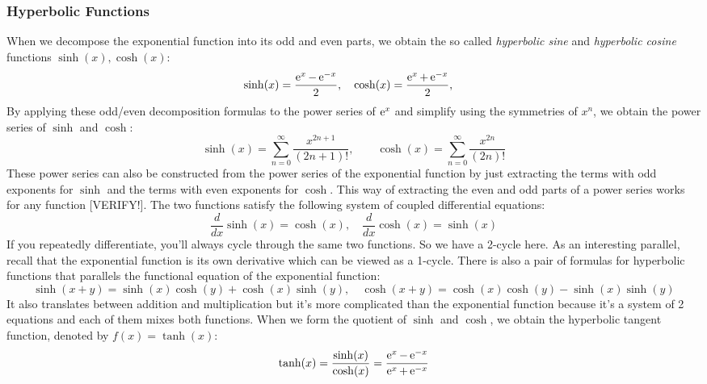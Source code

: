\subsubsection{Hyperbolic Functions}
When we decompose the exponential function into its odd and even parts, we obtain the so called \emph{hyperbolic sine} and \emph{hyperbolic cosine} functions $\sinh(x), \cosh(x)$:
\begin{equation}
\sinh(x) =	\frac{\operatorname{\mathrm{e}}^x - \operatorname{\mathrm{e}}^{-x}}{2}, \quad	
\cosh(x) =	\frac{\operatorname{\mathrm{e}}^x + \operatorname{\mathrm{e}}^{-x}}{2}, \quad
\end{equation}
By applying these odd/even decomposition formulas to the power series of $\operatorname{\mathrm{e}}^x$ and simplify using the symmetries of $x^n$, we obtain the power series of $\sinh$ and $\cosh$: 
\begin{equation}
\sinh(x) = \sum_{n=0}^{\infty} \frac{x^{2n+1}}{(2n+1)!}, \qquad
\cosh(x) = \sum_{n=0}^{\infty} \frac{x^{2n}  }{(2n)!}
\end{equation}
These power series can also be constructed from the power series of the exponential function by just extracting the terms with odd exponents for $\sinh$ and the terms with even exponents for $\cosh$. This way of extracting the even and odd parts of a power series works for any function [VERIFY!]. The two functions satisfy the following system of coupled differential equations:
\begin{equation}
\frac{d}{dx} \sinh(x) = \cosh(x), \quad
\frac{d}{dx} \cosh(x) = \sinh(x)
\end{equation} 
If you repeatedly differentiate, you'll always cycle through the same two functions. So we have a 2-cycle here. As an interesting parallel, recall that the exponential function is its own derivative which can be viewed as a 1-cycle. There is also a pair of formulas for hyperbolic functions that parallels the functional equation of the exponential function:
\begin{equation}
\sinh(x+y) = \sinh(x) \cosh(y) + \cosh(x) \sinh(y), \quad
\cosh(x+y) = \cosh(x) \cosh(y) - \sinh(x) \sinh(y)
\end{equation}
It also translates between addition and multiplication but it's more complicated than the exponential function because it's a system of 2 equations and each of them mixes both functions. When we form the quotient of $\sinh$ and $\cosh$, we obtain the hyperbolic tangent function, denoted by $f(x) = \tanh(x)$:
\begin{equation}
\tanh(x) =	\frac{\sinh(x)}{\cosh(x)} 
         = \frac{\operatorname{\mathrm{e}}^x - \operatorname{\mathrm{e}}^{-x}}{\operatorname{\mathrm{e}}^x + \operatorname{\mathrm{e}}^{-x}}
\end{equation}





